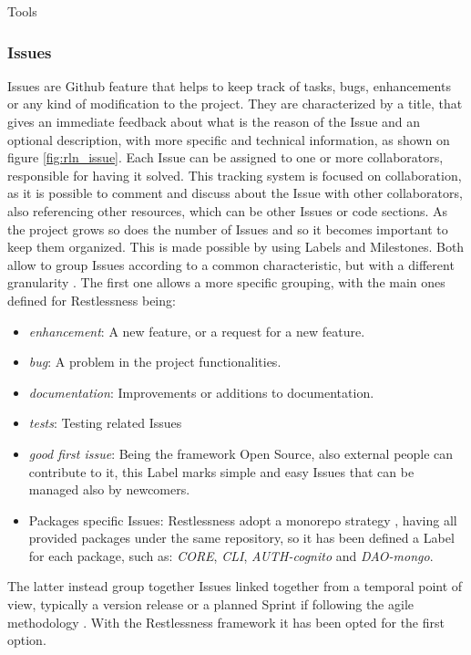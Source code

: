 \begin{chapter}{Tools}
    \subsubsection{Issues}
    Issues are Github feature that helps to keep track of tasks, bugs, enhancements
    or any kind of modification to the project. They are characterized by a title,
    that gives an immediate feedback about what is the reason of the Issue and an
    optional description, with more specific and technical information, as shown
    on figure \ref{fig:rln_issue}. Each Issue can be assigned to one or more
    collaborators, responsible for having it solved. This tracking system is focused
    on collaboration, as it is possible to comment and discuss about the Issue with
    other collaborators, also referencing other resources, which can be other Issues
    or code sections.
    As the project grows so does the number of Issues and so it becomes important to
    keep them organized. This is made possible by using Labels and Milestones.
    Both allow to group Issues according to a common characteristic, but with a
    different granularity \cite{github_issues}.
    The first one allows a more specific grouping, with the main ones defined for
    Restlessness being:
    \begin{itemize}
        \item \textit{enhancement}: A new feature, or a request for a new feature.
        \item \textit{bug}: A problem in the project functionalities.
        \item \textit{documentation}: Improvements or additions to documentation.
        \item \textit{tests}: Testing related Issues
        \item \textit{good first issue}: Being the framework Open Source, also
            external people can contribute to it, this Label marks simple and easy
            Issues that can be managed also by newcomers.
        \item Packages specific Issues: Restlessness adopt a monorepo  strategy
            \cite{monorepo}, having all provided packages under the same repository,
            so it has been defined a Label for each package, such as: \textit{CORE},
            \textit{CLI}, \textit{AUTH-cognito} and \textit{DAO-mongo}.
    \end{itemize}
    The latter instead group together Issues linked together from a temporal point
    of view, typically a version release or a planned Sprint if following the agile
    methodology \cite{agile}. With the Restlessness framework it has been opted for
    the first option.



\end{chapter}
